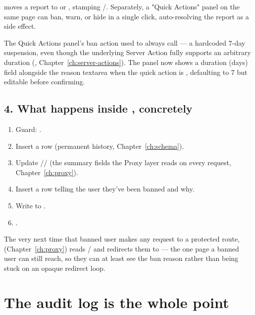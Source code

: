  moves a report to  or , stamping /. Separately, a "Quick Actions" panel on the same page can ban, warn, or hide in a single click, auto-resolving the report as a side effect.

\begin{olknote}
The Quick Actions panel's ban action used to always call  — a hardcoded 7-day suspension, even though the underlying  Server Action fully supports an arbitrary duration (, Chapter~\ref{ch:server-actions}). The panel now shows a duration (days) field alongside the reason textarea when the quick action is , defaulting to 7 but editable before confirming.
\end{olknote}

\subsection*{4. What happens inside , concretely}

\begin{enumerate}
  \item Guard: .
  \item Insert a  row (permanent history, Chapter~\ref{ch:schema}).
  \item Update // (the summary fields the Proxy layer reads on every request, Chapter~\ref{ch:proxy}).
  \item Insert a  row telling the user they've been banned and why.
  \item Write to .
  \item {}.
\end{enumerate}

The very next time that banned user makes any request to a protected route,  (Chapter~\ref{ch:proxy}) reads / and redirects them to  — the one page a banned user can still reach, so they can at least see the ban reason rather than being stuck on an opaque redirect loop.

\section{The audit log is the whole point}

